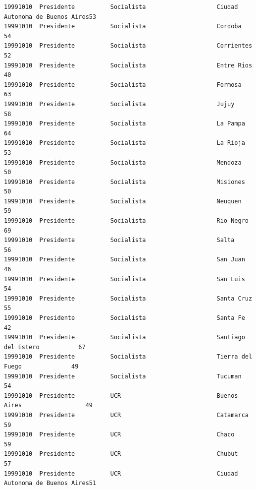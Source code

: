 \documentclass[a4paper,10pt]{article}
\begin{document}
\begin{verbatim}
19991010  Presidente          Socialista                    Ciudad Autonoma de Buenos Aires53             
19991010  Presidente          Socialista                    Cordoba                       54             
19991010  Presidente          Socialista                    Corrientes                    52             
19991010  Presidente          Socialista                    Entre Rios                    40             
19991010  Presidente          Socialista                    Formosa                       63             
19991010  Presidente          Socialista                    Jujuy                         58             
19991010  Presidente          Socialista                    La Pampa                      64             
19991010  Presidente          Socialista                    La Rioja                      53             
19991010  Presidente          Socialista                    Mendoza                       50             
19991010  Presidente          Socialista                    Misiones                      50             
19991010  Presidente          Socialista                    Neuquen                       59             
19991010  Presidente          Socialista                    Rio Negro                     69             
19991010  Presidente          Socialista                    Salta                         56             
19991010  Presidente          Socialista                    San Juan                      46             
19991010  Presidente          Socialista                    San Luis                      54             
19991010  Presidente          Socialista                    Santa Cruz                    55             
19991010  Presidente          Socialista                    Santa Fe                      42             
19991010  Presidente          Socialista                    Santiago del Estero           67             
19991010  Presidente          Socialista                    Tierra del Fuego              49             
19991010  Presidente          Socialista                    Tucuman                       54             
19991010  Presidente          UCR                           Buenos Aires                  49             
19991010  Presidente          UCR                           Catamarca                     59             
19991010  Presidente          UCR                           Chaco                         59             
19991010  Presidente          UCR                           Chubut                        57             
19991010  Presidente          UCR                           Ciudad Autonoma de Buenos Aires51             

\end{verbatim}
\end{document}
